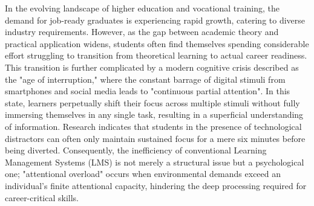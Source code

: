 
In the evolving landscape of higher education and vocational training, the demand for job-ready graduates is experiencing rapid growth, catering to diverse industry requirements. However, as the gap between academic theory and practical application widens, students often find themselves spending considerable effort struggling to transition from theoretical learning to actual career readiness. This transition is further complicated by a modern cognitive crisis described as the "age of interruption," where the constant barrage of digital stimuli from smartphones and social media leads to "continuous partial attention". In this state, learners perpetually shift their focus across multiple stimuli without fully immersing themselves in any single task, resulting in a superficial understanding of information. Research indicates that students in the presence of technological distractors can often only maintain sustained focus for a mere six minutes before being diverted. Consequently, the inefficiency of conventional Learning Management Systems (LMS) is not merely a structural issue but a psychological one; "attentional overload" occurs when environmental demands exceed an individual's finite attentional capacity, hindering the deep processing required for career-critical skills\cite{Shan2023Impact}.

